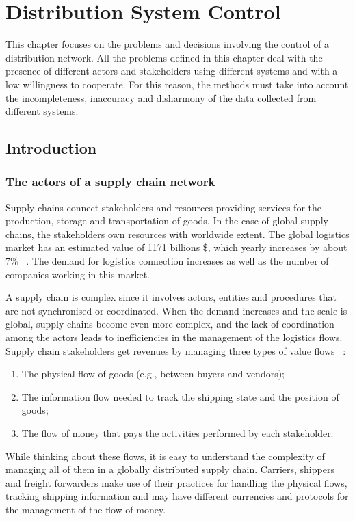 \chapter{Distribution System Control}{} \label{chapDistControl}
This chapter focuses on the problems and decisions involving the control of a distribution network. All the problems defined in this chapter deal with the presence of different actors and stakeholders using different systems and with a low willingness to cooperate. For this reason, the methods must take into account the incompleteness, inaccuracy and disharmony of the data collected from different systems.

\section{Introduction}
\subsection{The actors of a supply chain network}
Supply chains connect stakeholders and resources providing services for the production, storage and transportation of goods. In the case of global supply chains, the stakeholders own resources with worldwide extent. The global logistics market has an estimated value of 1171 billions \$, which yearly increases by about 7\% ~\cite{Researchandmarkets2018}. The demand for logistics connection increases as well as the number of companies working in this market. \par

A supply chain is complex since it involves actors, entities and procedures that are not synchronised or coordinated. When the demand increases and the scale is global, supply chains become even more complex, and the lack of coordination among the actors leads to inefficiencies in the management of the logistics flows. Supply chain stakeholders get revenues by managing three types of value flows ~\cite{Li2019}:

\begin{enumerate}
    \item The physical flow of goods (e.g., between buyers and vendors);
    \item The information flow needed to track the shipping state and the position of goods;
    \item The flow of money that pays the activities performed by each stakeholder.
\end{enumerate}

While thinking about these flows, it is easy to understand the complexity of managing all of them in a globally distributed supply chain. Carriers, shippers and freight forwarders make use of their practices for handling the physical flows, tracking shipping information and may have different currencies and protocols for the management of the flow of money.\par

